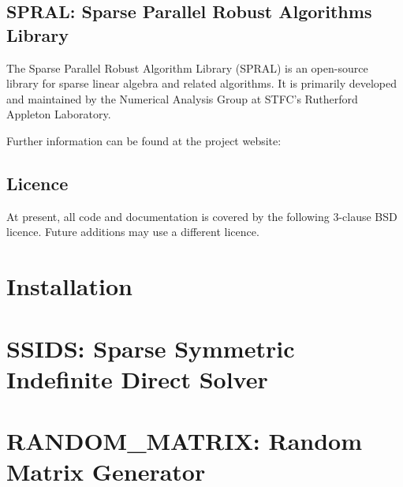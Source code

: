 \documentclass{spralweb}
\begin{document}
\let\oldthesection\thesection
\renewcommand{\thesection}{}
\section[About]{SPRAL: Sparse Parallel Robust Algorithms Library}
The Sparse Parallel Robust Algorithm Library (SPRAL) is an open-source library
for sparse linear algebra and related algorithms. It is primarily developed and
maintained by the Numerical Analysis Group at STFC's Rutherford Appleton Laboratory.

\noindent
Further information can be found at the project website:

\section{Licence}
At present, all code and documentation is covered by the following 3-clause BSD
licence. Future additions may use a different licence.



\renewcommand{\thesection}{\oldthesection}

\chapter{Installation}

\chapter{SSIDS: Sparse Symmetric Indefinite Direct Solver}

\chapter{RANDOM\_MATRIX: Random Matrix Generator}

\end{document}
